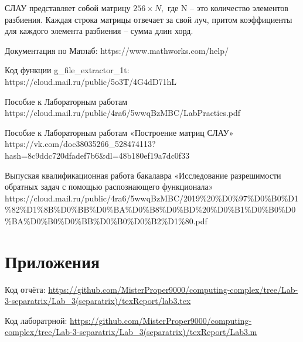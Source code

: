 \documentclass[a4]{article}
\begin{document}
СЛАУ представляет собой матрицу $256\times N,$ где N – это количество элементов разбиения.
Каждая строка матрицы отвечает за свой луч, притом коэффициенты для каждого элемента разбиения – сумма длин хорд.


\begin{thebibliography}{}
      Документация по Матлаб: https://www.mathworks.com/help/

     Код функции g\_file\_extractor\_1t: https://cloud.mail.ru/public/5o3T/4G4dD71hL
    
    Пособие к Лабораторным работам https://cloud.mail.ru/public/4ra6/5wwqBzMBC/LabPractics.pdf
    
    Пособие к Лабораторным работам «Построение матриц СЛАУ» https://vk.com/doc38035266\_528474113?hash=8c9ddc720dfadef7b6\&dl=48b180ef19a7dc0f33
    
    Выпуская квалификационная работа бакалавра «Исследование разрешимости обратных задач с помощью распознающего функционала» https://cloud.mail.ru/public/4ra6/5wwqBzMBC/2019\%20\%D0\%97\%D0\%B0\%D1\%82\%D1\%8B\%D0\%BB\%D0\%BA\%D0\%B8\%D0\%BD\%20\%D0\%B1\%D0\%B0\%D0\%BA\%D0\%B0\%D0\%BB\%D0\%B0\%D0\%B2\%D1\%80.pdf
\end{thebibliography}

\section{Приложения}

Код отчёта:\; \url{https://github.com/MisterProper9000/computing-complex/tree/Lab-3-separatrix/Lab_3(separatrix)/texReport/lab3.tex}

Код лаборатрной:\; \url{https://github.com/MisterProper9000/computing-complex/tree/Lab-3-separatrix/Lab_3(separatrix)/texReport/Lab3.m}
\end{document}

